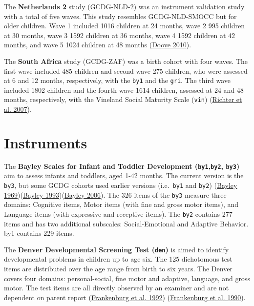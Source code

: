 \documentclass[
]{book}
\begin{document}
The \textbf{Netherlands 2} study (GCDG-NLD-2) was an instrument validation study with a total of five waves. This study resembles GCDG-NLD-SMOCC but for older children. Wave 1 included 1016 children at 24 months, wave 2 995 children at 30 months, wave 3 1592 children at 36 months, wave 4 1592 children at 42 months, and wave 5 1024 children at 48 months (\protect\hyperlink{ref-doove2010}{Doove 2010}).

The \textbf{South Africa} study (GCDG-ZAF) was a birth cohort with four waves. The first wave included 485 children and second wave 275 children, who were assessed at 6 and 12 months, respectively, with the \texttt{by1} and the \texttt{gri}. The third wave included 1802 children and the fourth wave 1614 children, assessed at 24 and 48 months, respectively, with the Vineland Social Maturity Scale (\texttt{vin}) (\protect\hyperlink{ref-Richter2007}{Richter et al. 2007}).

\hypertarget{sec:instruments}{%
\section{Instruments}\label{sec:instruments}}

The \textbf{Bayley Scales for Infant and Toddler Development (\texttt{by1},\texttt{by2}, \texttt{by3})} aim to assess infants and toddlers, aged 1-42 months. The current version is the \texttt{by3}, but some GCDG cohorts used earlier versions (i.e.~\texttt{by1} and \texttt{by2}) (\protect\hyperlink{ref-bayley1969}{Bayley 1969})(\protect\hyperlink{ref-bayley1993}{Bayley 1993})(\protect\hyperlink{ref-bayley2006}{Bayley 2006}). The 326 items of the \texttt{by3} measure three domains: Cognitive items, Motor items (with fine and gross motor items), and Language items (with expressive and receptive items). The \texttt{by2} contains 277 items and has two additional subscales: Social-Emotional and Adaptive Behavior. by1 contains 229 items.

The \textbf{Denver Developmental Screening Test (\texttt{den})} is aimed to identify developmental problems in children up to age six. The 125 dichotomous test items are distributed over the age range from birth to six years. The Denver covers four domains: personal-social, fine motor and adaptive, language, and gross motor. The test items are all directly observed by an examiner and are not dependent on parent report (\protect\hyperlink{ref-frankenburg1992}{Frankenburg et al. 1992}) (\protect\hyperlink{ref-frankenburg1990}{Frankenburg et al. 1990}).
\end{document}
